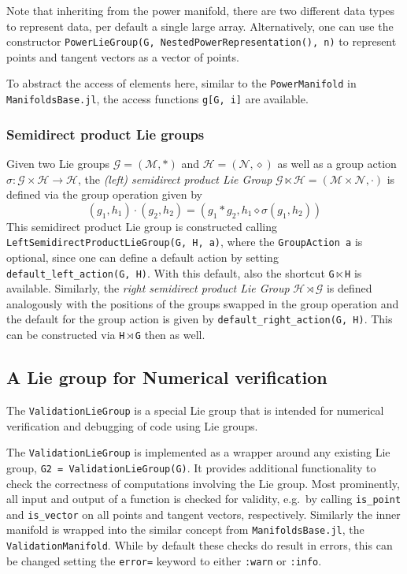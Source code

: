 \documentclass{juliacon}
\newcommand{\term}[1]{\emph{#1}}
\begin{document}
Note that inheriting from the power manifold, there are two different data types to represent data, per default a single large array. Alternatively, one can use the constructor \verb|PowerLieGroup(G, NestedPowerRepresentation(), n)| to represent points and tangent vectors as a vector of points.

To abstract the access of elements here, similar to the \verb|PowerManifold| in \verb|ManifoldsBase.jl|, the access functions \verb|g[G, i]| are available.

\subsubsection*{Semidirect product Lie groups}

Given two Lie groups \(\mathcal{G} = (\mathcal M, \ast)\) and \(\mathcal{H} = (\mathcal N, \diamond)\) as well as a group action \(\sigma\colon \mathcal{G} \times \mathcal{H} \to \mathcal{H}\),
the \term{(left) semidirect product Lie Group} $\mathcal{G} \ltimes \mathcal{H} = (\mathcal{M} \times \mathcal{N}, \cdot)$ is defined via the group operation given by
\begin{equation*}
    (g_1, h_1) \cdot (g_2, h_2) = (g_1 \ast g_2, h_1 \diamond \sigma(g_1, h_2))
\end{equation*}
This semidirect product Lie group is constructed calling \verb|LeftSemidirectProductLieGroup(G, H, a)|, where the \verb|GroupAction a| is optional, since one can define a default action by setting \verb|default_left_action(G, H)|.
With this default, also the shortcut \verb|G|\,$\ltimes$\,\verb|H| is available.
%
Similarly, the \term{right semidirect product Lie Group} $\mathcal{H} \rtimes \mathcal{G}$ is defined analogously with the positions of the groups swapped in the group operation and the default for the group action is given by \verb|default_right_action(G, H)|. This can be constructed via \verb|H|\,$\rtimes$\,\verb|G| then as well.

\subsection{A Lie group for Numerical verification}

The \verb|ValidationLieGroup| is a special Lie group that is intended for numerical verification and debugging of code using Lie groups.

The \verb|ValidationLieGroup| is implemented as a wrapper around any existing Lie group, \verb|G2 = ValidationLieGroup(G)|. It provides additional functionality to check the correctness of computations involving the Lie group. Most prominently,
all input and output of a function is checked for validity, e.g.\ by calling \verb|is_point| and \verb|is_vector| on all points and tangent vectors, respectively. Similarly the inner manifold is wrapped into the similar concept from \verb|ManifoldsBase.jl|, the \verb|ValidationManifold|.
While by default these checks do result in errors, this can be changed setting the \verb|error=| keyword to either \verb|:warn| or \verb|:info|.
\end{document}

